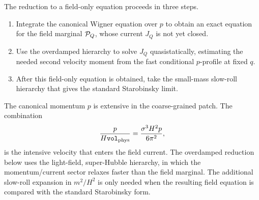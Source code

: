 \documentclass{article}
\newcommand{\Vphys}{\mathtt{vol}_{\rm phys}}
\numberwithin{equation}{section}
\begin{document}
The reduction to a field-only equation proceeds in three steps.
\begin{enumerate}
    \item Integrate the canonical Wigner equation over \(p\) to obtain an exact equation for the field marginal \({\cal P}_Q\), whose current \(J_Q\) is not yet closed.
    \item Use the overdamped hierarchy to solve \(J_Q\) quasistatically, estimating the needed second velocity moment from the fast conditional \(p\)-profile at fixed \(q\).
    \item After this field-only equation is obtained, take the small-mass slow-roll hierarchy that gives the standard Starobinsky limit.
\end{enumerate}
The canonical momentum \(p\) is extensive in the coarse-grained patch. The combination
\begin{equation}
    \frac{p}{H\Vphys}=\frac{\sigma^3H^2 p}{6\pi^2},
\end{equation}
is the intensive velocity that enters the field current. The overdamped reduction below uses the light-field, super-Hubble hierarchy, in which the momentum/current sector relaxes faster than the field marginal. The additional slow-roll expansion in \(m^2/H^2\) is only needed when the resulting field equation is compared with the standard Starobinsky form.
\end{document}
